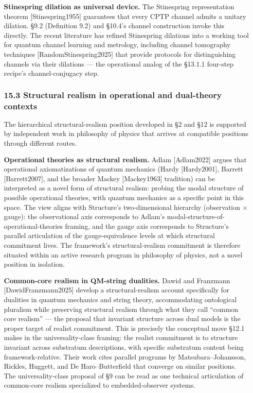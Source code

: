 \documentclass[
]{article}
\begin{document}
\textbf{Stinespring dilation as universal device.} The Stinespring
representation theorem {[}Stinespring1955{]} guarantees that every CPTP
channel admits a unitary dilation. §9.2 (Definition 9.2) and §10.4's
channel construction invoke this directly. The recent literature has
refined Stinespring dilations into a working tool for quantum channel
learning and metrology, including channel tomography techniques
{[}RandomStinespring2025{]} that provide protocols for distinguishing
channels via their dilations --- the operational analog of the §13.1.1
four-step recipe's channel-conjugacy step.

\hypertarget{structural-realism-in-operational-and-dual-theory-contexts}{%
\subsubsection{15.3 Structural realism in operational and dual-theory
contexts}\label{structural-realism-in-operational-and-dual-theory-contexts}}

The hierarchical structural-realism position developed in §2 and §12 is
supported by independent work in philosophy of physics that arrives at
compatible positions through different routes.

\textbf{Operational theories as structural realism.} Adlam
{[}Adlam2022{]} argues that operational axiomatizations of quantum
mechanics (Hardy {[}Hardy2001{]}, Barrett {[}Barrett2007{]}, and the
broader Mackey {[}Mackey1963{]} tradition) can be interpreted as a novel
form of structural realism: probing the modal structure of possible
operational theories, with quantum mechanics as a specific point in this
space. The view aligns with Structure's two-dimensional hierarchy
(observation × gauge): the observational axis corresponds to Adlam's
modal-structure-of-operational-theories framing, and the gauge axis
corresponds to Structure's parallel articulation of the
gauge-equivalence levels at which structural commitment lives. The
framework's structural-realism commitment is therefore situated within
an active research program in philosophy of physics, not a novel
position in isolation.

\textbf{Common-core realism in QM-string dualities.} Dawid and Franzmann
{[}DawidFranzmann2025{]} develop a structural-realism account
specifically for dualities in quantum mechanics and string theory,
accommodating ontological pluralism while preserving structural realism
through what they call ``common core realism'' --- the proposal that
invariant structure across dual models is the proper target of realist
commitment. This is precisely the conceptual move §12.1 makes in the
universality-class framing: the realist commitment is to structure
invariant across substratum descriptions, with specific substratum
content being framework-relative. Their work cites parallel programs by
Matsubara--Johansson, Rickles, Huggett, and De Haro--Butterfield that
converge on similar positions. The universality-class proposal of §9 can
be read as one technical articulation of common-core realism specialized
to embedded-observer systems.
\end{document}
